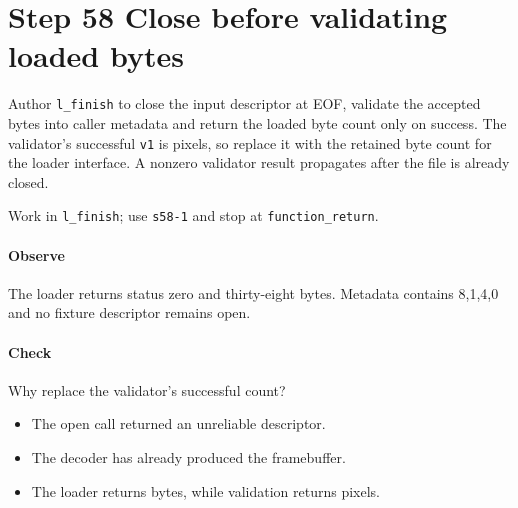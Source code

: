 \section{Step 58 Close before validating loaded bytes}\label{qoi-s58}
Author \texttt{l\_finish} to close the input descriptor at EOF, validate the accepted bytes into caller metadata and return the loaded byte count only on success. The validator’s successful \texttt{v1} is pixels, so replace it with the retained byte count for the loader interface. A nonzero validator result propagates after the file is already closed.

Work in \texttt{l\_finish}; use \texttt{s58-1} and stop at \texttt{function\_return}.

\paragraph{Observe} The loader returns status zero and thirty-eight bytes. Metadata contains 8,1,4,0 and no fixture descriptor remains open.

\paragraph{Check} Why replace the validator’s successful count?
\begin{itemize}
  \item[A.] The open call returned an unreliable descriptor.
  \item[B.] The decoder has already produced the framebuffer.
  \item[C.] The loader returns bytes, while validation returns pixels.
\end{itemize}
